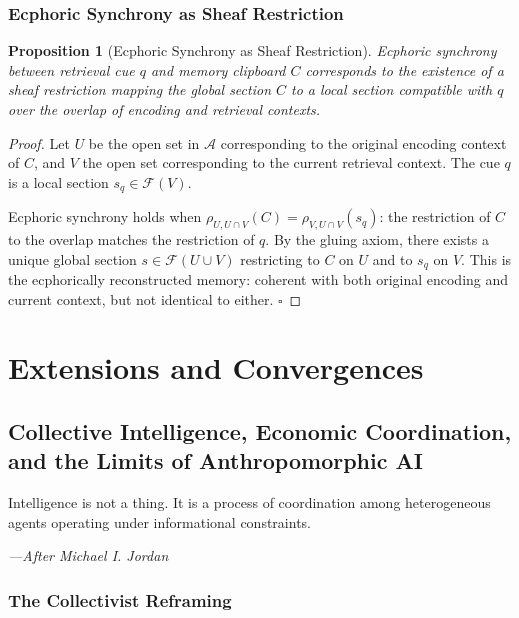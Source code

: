 \documentclass[12pt,oneside]{book}
\theoremstyle{plain}
\newtheorem{proposition}[theorem]{Proposition}
\theoremstyle{definition}
\theoremstyle{plain}
\newcommand{\cA}{\mathcal{A}}
\begin{document}
\section{Ecphoric Synchrony as Sheaf Restriction}

\begin{proposition}[Ecphoric Synchrony as Sheaf Restriction]
Ecphoric synchrony between retrieval cue $q$ and memory clipboard $C$ corresponds to the existence of a sheaf restriction mapping the global section $C$ to a local section compatible with $q$ over the overlap of encoding and retrieval contexts.
\end{proposition}

\begin{proof}
Let $U$ be the open set in $\cA$ corresponding to the original encoding context of $C$, and $V$ the open set corresponding to the current retrieval context. The cue $q$ is a local section $s_q \in \mathcal{F}(V)$.

Ecphoric synchrony holds when $\rho_{U, U \cap V}(C) = \rho_{V, U \cap V}(s_q)$: the restriction of $C$ to the overlap matches the restriction of $q$. By the gluing axiom, there exists a unique global section $s \in \mathcal{F}(U \cup V)$ restricting to $C$ on $U$ and to $s_q$ on $V$. This is the ecphorically reconstructed memory: coherent with both original encoding and current context, but not identical to either. $\square$
\end{proof}

\part{Extensions and Convergences}

\chapter{Collective Intelligence, Economic Coordination, and the Limits of Anthropomorphic AI}
\label{ch:jordan}

\epigraph{Intelligence is not a thing. It is a process of coordination among heterogeneous agents operating under informational constraints.}{\textit{---After Michael I. Jordan}}

\section{The Collectivist Reframing}
\end{document}
